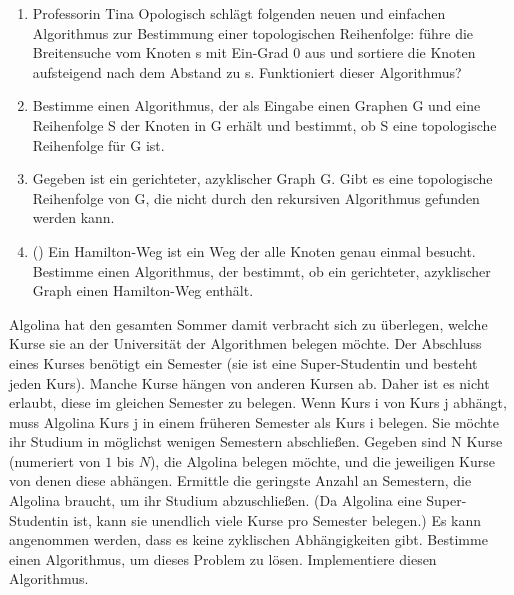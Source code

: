 \documentclass{uebung_cs}
\begin{document}
\begin{aufgabe}
	\begin{enumerate}
		\item Professorin Tina Opologisch schlägt folgenden neuen und einfachen Algorithmus zur Bestimmung einer topologischen Reihenfolge: führe die Breitensuche vom Knoten s mit Ein-Grad $0$ aus und sortiere die Knoten aufsteigend nach dem Abstand zu s. Funktioniert dieser Algorithmus?
		\item Bestimme einen Algorithmus, der als Eingabe einen Graphen G und eine Reihenfolge S der Knoten in G erhält und bestimmt, ob S eine topologische Reihenfolge für G ist.
		\item Gegeben ist ein gerichteter, azyklischer Graph G.
		Gibt es eine topologische Reihenfolge von G, die nicht durch den rekursiven Algorithmus gefunden werden kann.
		\item (\hard) Ein Hamilton-Weg ist ein Weg der alle Knoten genau einmal besucht.
		Bestimme einen Algorithmus, der bestimmt, ob ein gerichteter, azyklischer Graph einen Hamilton-Weg enthält.
	\end{enumerate}
\end{aufgabe}


\begin{aufgabe}[Studiengangplanung]
Algolina hat den gesamten Sommer damit verbracht sich zu überlegen, welche Kurse sie an der Universität der Algorithmen belegen möchte.
Der Abschluss eines Kurses benötigt ein Semester (sie ist eine Super-Studentin und besteht jeden Kurs). Manche Kurse hängen von anderen Kursen ab.
Daher ist es nicht erlaubt, diese im gleichen Semester zu belegen. Wenn Kurs i von Kurs j abhängt, muss Algolina Kurs j in einem früheren Semester als Kurs i belegen.
Sie möchte ihr Studium in möglichst wenigen Semestern abschließen.
Gegeben sind N Kurse (numeriert von $1$ bis $N$), die Algolina belegen möchte, und die jeweiligen Kurse von denen diese abhängen.
Ermittle die geringste Anzahl an Semestern, die Algolina braucht, um ihr Studium abzuschließen.
(Da Algolina eine Super-Studentin ist, kann sie unendlich viele Kurse pro Semester belegen.)
Es kann angenommen werden, dass es keine zyklischen Abhängigkeiten gibt.
Bestimme einen Algorithmus, um dieses Problem zu lösen. Implementiere diesen Algorithmus.
\end{aufgabe}
\end{document}
